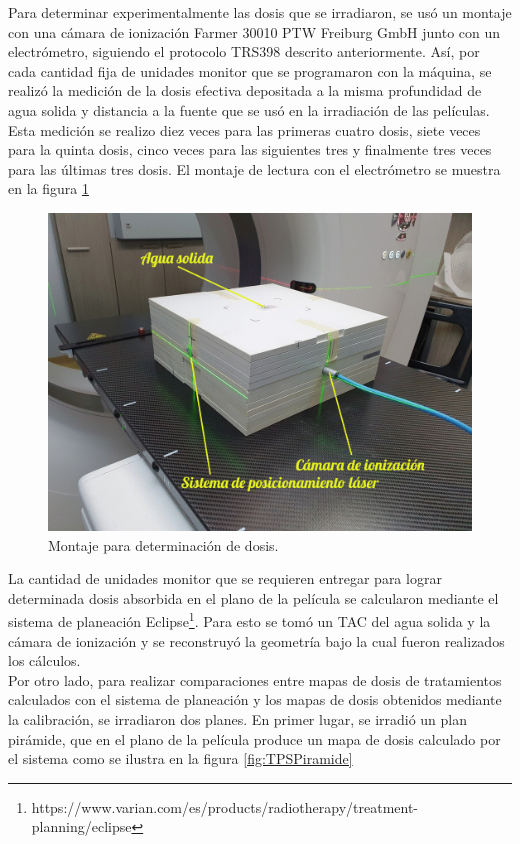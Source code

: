 Para determinar experimentalmente las dosis que se irradiaron, se usó un montaje con una cámara de ionización Farmer 30010 PTW Freiburg GmbH junto con un electrómetro, siguiendo el protocolo TRS398 descrito anteriormente. Así, por cada cantidad fija de unidades monitor que se programaron con la máquina, se realizó la medición de la dosis efectiva depositada a la misma profundidad de agua solida y distancia a la fuente que se usó en la irradiación de las películas. Esta medición se realizo diez veces para las primeras cuatro dosis, siete veces para la quinta dosis, cinco veces para las siguientes tres y finalmente tres veces para las últimas tres dosis. El montaje de lectura con el electrómetro se muestra en la figura \ref{fig:Montajeelectrometro}\\
\begin{figure}[H]
	\centering
	\includegraphics[width=0.7\linewidth]{images/elctrometro.jpg}
	
	\caption{Montaje para determinación de dosis.}
	\label{fig:Montajeelectrometro}
\end{figure}

La cantidad de unidades monitor que se requieren entregar para lograr determinada dosis absorbida en el plano de la película se calcularon mediante el sistema de planeación Eclipse\footnote{https://www.varian.com/es/products/radiotherapy/treatment-planning/eclipse}. Para esto se tomó un TAC del agua solida y la cámara de ionización y se reconstruyó la geometría bajo la cual fueron realizados los cálculos.\\

Por otro lado, para realizar comparaciones entre mapas de dosis de tratamientos calculados con el sistema de planeación y los mapas de dosis obtenidos mediante la calibración, se irradiaron dos planes. En primer lugar, se irradió un plan pirámide, que en el plano de la película produce un mapa de dosis calculado por el sistema como se ilustra en la figura \ref{fig:TPSPiramide}\\

